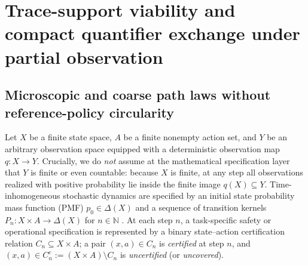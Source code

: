 \documentclass[11pt,a4paper]{article}
\newcounter{none}
\begin{document}
\section{Trace-support viability and compact quantifier exchange under
partial
observation}\label{trace-support-viability-and-compact-quantifier-exchange-under-partial-observation}

\subsection{Microscopic and coarse path laws without reference-policy
circularity}\label{microscopic-and-coarse-path-laws-without-reference-policy-circularity}

Let \(X\) be a finite state space, \(A\) be a finite nonempty action
set, and \(Y\) be an arbitrary observation space equipped with a
deterministic observation map \(q: X \to Y\). Crucially, we do
\emph{not} assume at the mathematical specification layer that \(Y\) is
finite or even countable: because \(X\) is finite, at any step all
observations realized with positive probability lie inside the finite
image \(q(X) \subseteq Y\). Time-inhomogeneous stochastic dynamics are
specified by an initial state probability mass function (PMF)
\(p_0 \in \Delta(X)\) and a sequence of transition kernels
\(P_n: X \times A \to \Delta(X)\) for \(n \in \mathbb{N}\)
\citep{paz1971, puterman1994}. At each step \(n\), a task-specific
safety or operational specification is represented by a binary
state--action certification relation \(C_n \subseteq X \times A\); a
pair \((x,a) \in C_n\) is \emph{certified} at step \(n\), and
\((x,a) \in C_n^c := (X \times A) \setminus C_n\) is \emph{uncertified}
(or \emph{uncovered}).
\end{document}
